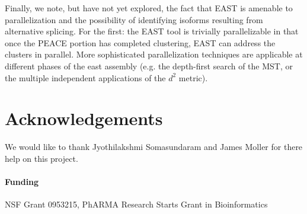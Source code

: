 \documentclass{bioinfo}
\newcommand{\peace} {{\small PEACE}}
\newcommand{\east} {{\small EAST}}
\begin{document}
Finally, we note, but have not yet explored, the fact that \east\/ is
amenable to parallelization and the possibility of identifying
isoforms resulting from alternative splicing.  For the first: the
\east\/ tool is trivially parallelizable in that once the \peace\/
portion has completed clustering, \east\/ can address the clusters in
parallel.  More sophisticated parallelization techniques are applicable
at different phases of the east assembly (e.g. the depth-first search
of the MST, or the multiple independent applications of the $d^2$ metric).  


\section*{Acknowledgements} We would like to thank Jyothilakshmi
Somasundaram and James Moller for there help on this project.

\paragraph{Funding\textcolon} NSF Grant 0953215, PhARMA Research
Starts Grant in Bioinformatics


\end{document}
